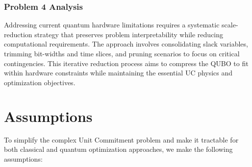 \documentclass{apmcmthesis}
\begin{document}
\subsubsection{Problem 4 Analysis}
Addressing current quantum hardware limitations requires a systematic scale-reduction strategy that preserves problem interpretability while reducing computational requirements. The approach involves consolidating slack variables, trimming bit-widths and time slices, and pruning scenarios to focus on critical contingencies. This iterative reduction process aims to compress the QUBO to fit within hardware constraints while maintaining the essential UC physics and optimization objectives.

\section{Assumptions}
To simplify the complex Unit Commitment problem and make it tractable for both classical and quantum optimization approaches, we make the following assumptions:
\end{document}
